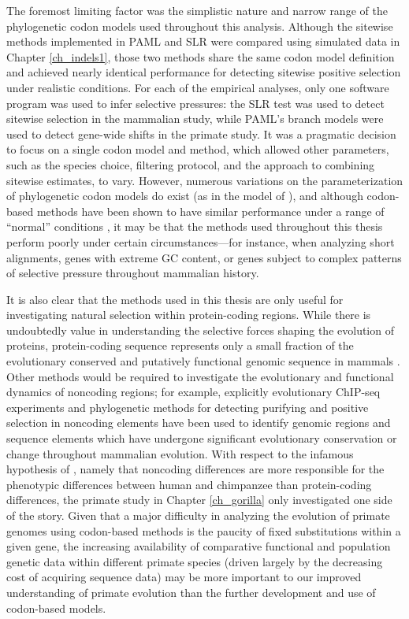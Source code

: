 The foremost limiting factor was the simplistic nature and narrow
range of the phylogenetic codon models used throughout this
analysis. Although the sitewise methods implemented in PAML and SLR
were compared using simulated data in Chapter \ref{ch_indels1}, those
two methods share the same codon model definition and achieved nearly
identical performance for detecting sitewise positive selection under
realistic conditions. For each of the empirical analyses, only one
software program was used to infer selective pressures: the SLR test
was used to detect sitewise selection in the mammalian study, while
PAML's branch models were used to detect gene-wide \dnds shifts in the
primate study. It was a pragmatic decision to focus on a single codon
model and method, which allowed other parameters, such as the species
choice, filtering protocol, and the approach to combining sitewise
estimates, to vary. However, numerous variations on the
parameterization of phylogenetic codon models do exist (as in the
model of \citet{Muse1994}), and although codon-based methods have been
shown to have similar performance under a range of ``normal''
conditions \citep{Pond2005a}, it may be that the methods used
throughout this thesis perform poorly under certain
circumstances---for instance, when analyzing short alignments, genes
with extreme GC content, or genes subject to complex patterns of
selective pressure throughout mammalian history.

It is also clear that the methods used in this thesis are only useful
for investigating natural selection within protein-coding
regions. While there is undoubtedly value in understanding the
selective forces shaping the evolution of proteins, protein-coding
sequence represents only a small fraction of the evolutionary
conserved and putatively functional genomic sequence in mammals
\citep{Ponting2011}. Other methods would be required to investigate
the evolutionary and functional dynamics of noncoding regions; for
example, explicitly evolutionary ChIP-seq experiments
\citep{Schmidt2010} and phylogenetic methods for detecting purifying
and positive selection in noncoding elements
\citep{Siepel2005,Pollard2010} have been used to identify genomic
regions and sequence elements which have undergone significant
evolutionary conservation or change throughout mammalian
evolution. With respect to the infamous hypothesis of
\citet{King1975}, namely that noncoding differences are more
responsible for the phenotypic differences between human and
chimpanzee than protein-coding differences, the primate study in
Chapter \ref{ch_gorilla} only investigated one side of the
story. Given that a major difficulty in analyzing the evolution of
primate genomes using codon-based methods is the paucity of fixed
substitutions within a given gene, the increasing availability of
comparative functional and population genetic data within different
primate species (driven largely by the decreasing cost of acquiring
sequence data) may be more important to our improved understanding of
primate evolution than the further development and use of codon-based
models.

